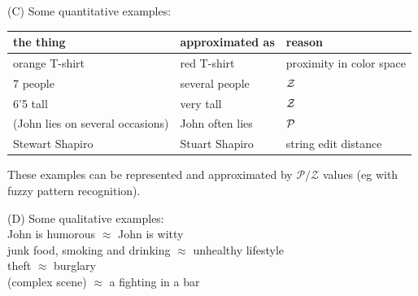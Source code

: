 (C) Some quantitative examples:\\
\hspace*{1cm} \begin{tabular}{|l|l|l|}
\hline
\textbf{the thing} & \textbf{approximated as} & \textbf{reason}\\
\hline
orange T-shirt     & red T-shirt      & proximity in color space\\
7 people           & several people   & $\mathcal{Z}$\\
6'5 tall           & very tall        & $\mathcal{Z}$\\
(John lies on several occasions) & John often lies & $\mathcal{P}$\\
Stewart Shapiro    & Stuart Shapiro   & string edit distance\\
\hline
\end{tabular}

These examples can be represented and approximated by $\mathcal{P/Z}$ values (eg with fuzzy pattern recognition).


(D) Some qualitative examples:\\
\hspace*{1cm} John is humorous $\approx$ John is witty\\
\hspace*{1cm} junk food, smoking and drinking $\approx$ unhealthy lifestyle\\
\hspace*{1cm} theft $\approx$ burglary\\
\hspace*{1cm} (complex scene) $\approx$ a fighting in a bar

